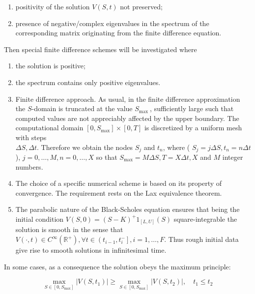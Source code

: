 \documentclass[10pt]{article}
\begin{document}
\begin{enumerate}
  \item positivity of the solution $V(S, t)$ not preserved;
  \item presence of negative/complex eigenvalues in the spectrum of the corresponding matrix originating from the finite difference equation.
\end{enumerate}

Then special finite difference schemes will be investigated where

\begin{enumerate}
  \item the solution is positive;
  \item the spectrum contains only positive eigenvalues.
  \item Finite difference approach. As usual, in the finite difference approximation the $S$-domain is truncated at the value $S_{\text {max }}$, sufficiently large such that computed values are not appreciably affected by the upper boundary. The computational domain $\left[0, S_{\max }\right] \times[0, T]$ is discretized by a uniform mesh with steps\\
$\Delta S, \Delta t$. Therefore we obtain the nodes $S_{j}$ and $t_{n}$, where ( $S_{j}=j \Delta S, t_{n}=n \Delta t$ ), $j=0, \ldots, M, n=0, \ldots, X$ so that $S_{\max }=M \Delta S, T=X \Delta t, X$ and $M$ integer numbers.
  \item The choice of a specific numerical scheme is based on its property of convergence. The requirement rests on the Lax equivalence theorem.
  \item The parabolic nature of the Black-Scholes equation ensures that being the initial condition $V(S, 0)=(S-K)^{+} 1_{[L, U]}(S)$ square-integrable the solution is smooth in the sense that $V(\cdot, t) \in C^{\infty}\left(\mathbb{R}^{+}\right), \forall t \in\left(t_{i-1}, t_{i}^{-}\right], i=1, \ldots, F$. Thus rough initial data give rise to smooth solutions in infinitesimal time.
\end{enumerate}

In some cases, as a consequence the solution obeys the maximum principle:


\begin{equation*}
\max _{S \in\left[0, S_{\max }\right]}\left|V\left(S, t_{1}\right)\right| \geq \max _{S \in\left[0, S_{\max }\right]}\left|V\left(S, t_{2}\right)\right|, \quad t_{1} \leq t_{2} \tag{6}
\end{equation*}
\end{document}

